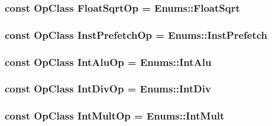 \label{op__class_8hh_aba45bb951b34e95a4ae2eda19d8d78ea}
\hypertarget{op__class_8hh_a1354cf7bc378478ac49aecb2af3f8132}{
\subsubsection[{FloatSqrtOp}]{\setlength{\rightskip}{0pt plus 5cm}const OpClass {\bf FloatSqrtOp} = Enums::FloatSqrt}}
\label{op__class_8hh_a1354cf7bc378478ac49aecb2af3f8132}
\hypertarget{op__class_8hh_acd5b2cee21df7d0f0475c985c89da515}{
\subsubsection[{InstPrefetchOp}]{\setlength{\rightskip}{0pt plus 5cm}const OpClass {\bf InstPrefetchOp} = Enums::InstPrefetch}}
\label{op__class_8hh_acd5b2cee21df7d0f0475c985c89da515}
\hypertarget{op__class_8hh_a57ffe59bbef6b948752d3b5086a33af9}{
\subsubsection[{IntAluOp}]{\setlength{\rightskip}{0pt plus 5cm}const OpClass {\bf IntAluOp} = Enums::IntAlu}}
\label{op__class_8hh_a57ffe59bbef6b948752d3b5086a33af9}
\hypertarget{op__class_8hh_a303ec67a6fe8b9a36513930abda060dd}{
\subsubsection[{IntDivOp}]{\setlength{\rightskip}{0pt plus 5cm}const OpClass {\bf IntDivOp} = Enums::IntDiv}}
\label{op__class_8hh_a303ec67a6fe8b9a36513930abda060dd}
\hypertarget{op__class_8hh_ae50ef4669f1d2743a6a3f6a104817cbc}{
\subsubsection[{IntMultOp}]{\setlength{\rightskip}{0pt plus 5cm}const OpClass {\bf IntMultOp} = Enums::IntMult}}
